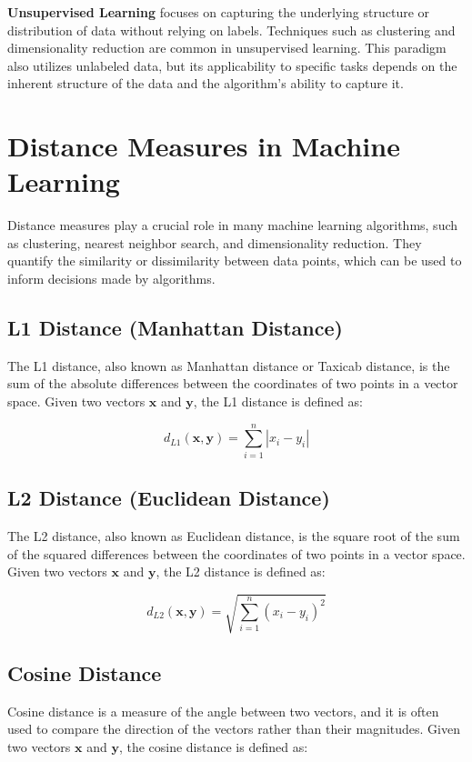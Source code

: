 \documentclass[12pt]{article}
\begin{document}
\textbf{Unsupervised Learning} focuses on capturing the underlying structure or distribution of data without relying on labels. Techniques such as clustering and dimensionality reduction are common in unsupervised learning. This paradigm also utilizes unlabeled data, but its applicability to specific tasks depends on the inherent structure of the data and the algorithm's ability to capture it.


\section{Distance Measures in Machine Learning}

Distance measures play a crucial role in many machine learning algorithms, such as clustering, nearest neighbor search, and dimensionality reduction. They quantify the similarity or dissimilarity between data points, which can be used to inform decisions made by algorithms.

\subsection{L1 Distance (Manhattan Distance)}

The L1 distance, also known as Manhattan distance or Taxicab distance, is the sum of the absolute differences between the coordinates of two points in a vector space. Given two vectors $\mathbf{x}$ and $\mathbf{y}$, the L1 distance is defined as:

$$d_{L1}(\mathbf{x}, \mathbf{y}) = \sum_{i=1}^{n} |x_i - y_i|$$

\subsection{L2 Distance (Euclidean Distance)}

The L2 distance, also known as Euclidean distance, is the square root of the sum of the squared differences between the coordinates of two points in a vector space. Given two vectors $\mathbf{x}$ and $\mathbf{y}$, the L2 distance is defined as:

$$d_{L2}(\mathbf{x}, \mathbf{y}) = \sqrt{\sum_{i=1}^{n} (x_i - y_i)^2}$$

\subsection{Cosine Distance}

Cosine distance is a measure of the angle between two vectors, and it is often used to compare the direction of the vectors rather than their magnitudes. Given two vectors $\mathbf{x}$ and $\mathbf{y}$, the cosine distance is defined as:
\end{document}
